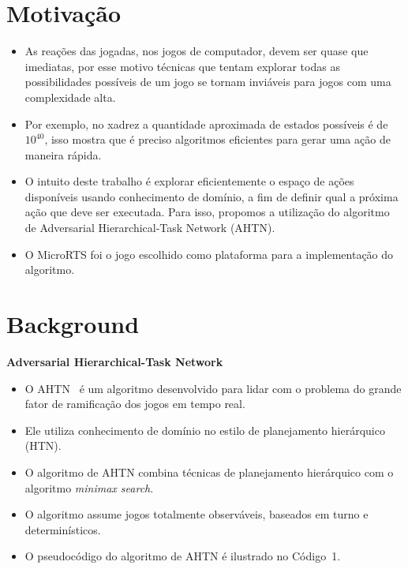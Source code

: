 \documentclass[a0,portrait]{a0poster}
\newcommand\itemadjust{\itemsep.5em \parskip0pt \parsep0pt}
\begin{document}
\begin{multicols}{2} 
	\color{NavyBlue}
	\color{Black}
	\raggedright
	\Large
	\color{NavyBlue}
	\section*{\huge Motiva\c{c}\~ao}
	\color{Black}
	
	\begin{itemize}
		\item As reações das jogadas, nos jogos de computador, devem ser quase que imediatas, por esse motivo técnicas que tentam explorar todas as possibilidades possíveis de um jogo se tornam inviáveis para jogos com uma complexidade alta.
		\item Por exemplo, no xadrez a quantidade aproximada de estados possíveis é de $10^{40}$, isso mostra que é preciso algoritmos eficientes para gerar uma ação de maneira rápida. 
		\item O intuito deste trabalho é explorar eficientemente o espaço de ações disponíveis usando conhecimento de domínio, a fim de definir qual a próxima ação que deve ser executada. Para isso, propomos a utilização do algoritmo de Adversarial Hierarchical-Task Network (AHTN).
		\item O MicroRTS foi o jogo escolhido como plataforma para a implementação do algoritmo.
	\end{itemize}
	
	\color{NavyBlue}
	\section*{\huge Background}
	\color{Black}
	
	\textbf{Adversarial Hierarchical-Task Network}
	\begin{itemize}
		\item O AHTN~\cite{ontanon2015adversarial} é um algoritmo desenvolvido para lidar com o problema do grande fator de ramificação dos jogos em tempo real. 
		\item Ele utiliza conhecimento de domínio no estilo de planejamento hierárquico (HTN).
		\item O algoritmo de AHTN combina técnicas de planejamento hierárquico com o algoritmo \textit{minimax search}.
		\item O algoritmo assume jogos totalmente observáveis, baseados em turno e determinísticos. 
		\item O pseudocódigo do algoritmo de AHTN é ilustrado no Código~1.
	\end{itemize}
	

\end{multicols}
\end{document}
